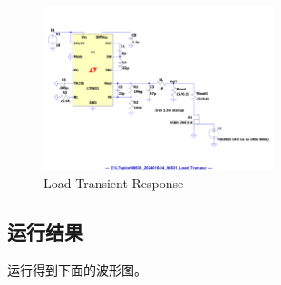 \documentclass[lang=cn,10pt]{elegantbook}
\begin{document}
\begin{figure}[!htb]
    \centering\includegraphics[page=1, width=0.6\textwidth]{figure/4_lt8631_Load_Tran_asc.pdf}
    \caption{Load Transient Response}
\end{figure}

\subsection{运行结果}

运行得到下面的波形图。
\end{document}
